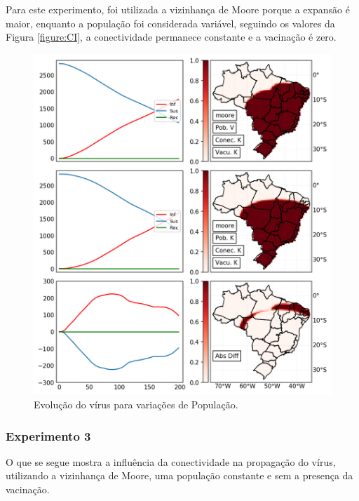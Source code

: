 \documentclass[a4paper,12pt]{article}
\begin{document}
Para este experimento, foi utilizada a vizinhança de Moore porque a expansão é maior, enquanto a população foi considerada variável, seguindo  os valores da Figura \ref{figure:CI}, a conectividade permanece constante e a vacinação é zero.

\begin{figure}[!ht]
 \begin{center}
  \includegraphics[width=1\linewidth]{fig/Poblacion.png}
 \end{center}
 \caption{Evolução do vírus para variações de População.}
\label{figure:populacao}
\end{figure}

\newpage
\subsubsection{Experimento 3}
\label{sub:exp3}
O que se segue mostra a influência da conectividade na propagação do vírus, utilizando a vizinhança de Moore, uma população constante e sem a presença da vacinação.
\end{document}
